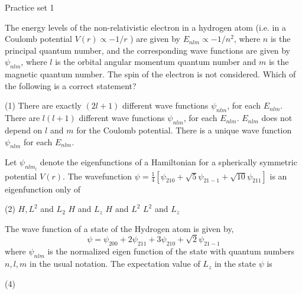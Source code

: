 \newpage
\begin{abox}
	Practice set 1
	\end{abox}
\begin{enumerate}
	\begin{minipage}{\textwidth}
		\item The energy levels of the non-relativistic electron in a hydrogen atom (i.e. in a Coulomb potential $V(r) \propto-1 / r$ ) are given by $E_{n l m} \propto-1 / n^{2}$, where $n$ is the principal quantum number, and the corresponding wave functions are given by $\psi_{n l m}$, where $l$ is the orbital angular momentum quantum number and $m$ is the magnetic quantum number. The spin of the electron is not considered. Which of the following is a correct statement?
	\end{minipage}
	\begin{tasks}(1)
		\task[\textbf{A.}] There are exactly $(2 l+1)$ different wave functions $\psi_{n l m}$, for each $E_{n l m}$.
		\task[\textbf{B.}]There are $l(l+1)$ different wave functions $\psi_{n l m}$, for each $E_{n l m}$.
		\task[\textbf{C.}] $E_{n l m}$ does not depend on $l$ and $m$ for the Coulomb potential.
		\task[\textbf{D.}]There is a unique wave function $\psi_{n l m}$ for each $E_{n l m}$.
	\end{tasks}
\begin{minipage}{\textwidth}
	\item Let $\psi_{n l m_{l}}$ denote the eigenfunctions of a Hamiltonian for a spherically symmetric potential $V(r)$. The wavefunction $\psi=\frac{1}{4}\left[\psi_{210}+\sqrt{5} \psi_{21-1}+\sqrt{10} \psi_{211}\right]$ is an eigenfunction only of
\end{minipage}
\begin{tasks}(2)
	\task[\textbf{A.}] $H, L^{2}$ and $L_{2}$
	\task[\textbf{B.}]$H$ and $L_{z}$
	\task[\textbf{C.}]$H$ and $L^{2}$
	\task[\textbf{D.}]$L^{2}$ and $L_{z}$
\end{tasks}
\begin{minipage}{\textwidth}
	\item The wave function of a state of the Hydrogen atom is given by,
	$$
	\psi=\psi_{200}+2 \psi_{211}+3 \psi_{210}+\sqrt{2} \psi_{21-1}
	$$
	where $\psi_{n l m}$ is the normalized eigen function of the state with quantum numbers $n, l, m$ in the usual notation. The expectation value of $L_{z}$ in the state $\psi$ is
\end{minipage}
\begin{tasks}(4)

\end{tasks}
\end{enumerate}

